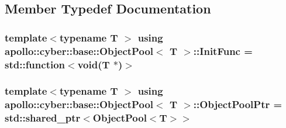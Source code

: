 \subsection{Member Typedef Documentation}
\hypertarget{classapollo_1_1cyber_1_1base_1_1ObjectPool_af46b770564c8080f800088ea25d9a830}{
\subsubsection[{Init\-Func}]{\setlength{\rightskip}{0pt plus 5cm}template$<$typename T $>$ using {\bf apollo\-::cyber\-::base\-::\-Object\-Pool}$<$ T $>$\-::{\bf Init\-Func} =  std\-::function$<$void(T $\ast$)$>$}}\label{classapollo_1_1cyber_1_1base_1_1ObjectPool_af46b770564c8080f800088ea25d9a830}
\hypertarget{classapollo_1_1cyber_1_1base_1_1ObjectPool_a40cf6e156676c64e8803be8ed930c43a}{
\subsubsection[{Object\-Pool\-Ptr}]{\setlength{\rightskip}{0pt plus 5cm}template$<$typename T $>$ using {\bf apollo\-::cyber\-::base\-::\-Object\-Pool}$<$ T $>$\-::{\bf Object\-Pool\-Ptr} =  std\-::shared\-\_\-ptr$<${\bf Object\-Pool}$<$T$>$$>$}}\label{classapollo_1_1cyber_1_1base_1_1ObjectPool_a40cf6e156676c64e8803be8ed930c43a}


